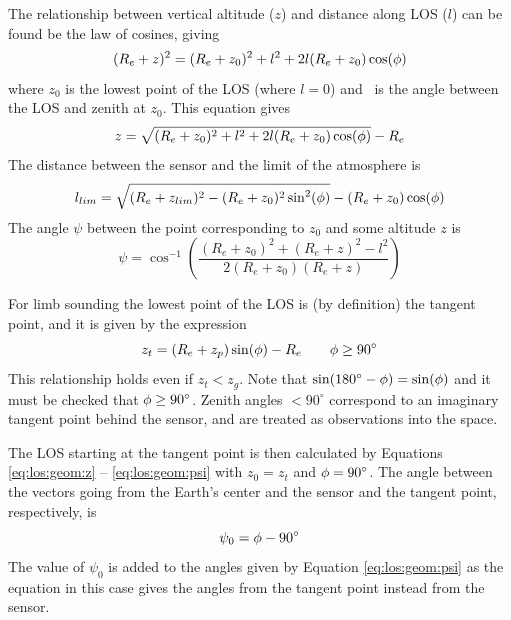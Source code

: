  
  \label{sec:los:general}

  The relationship between vertical altitude ($z$) and distance along
  LOS ($l$) can be found be the law of cosines, giving
  \begin{equation}
    (R_e+z)^2 = (R_e+z_0)^2 + l^2 + 2l(R_e+z_0)\cos(\phi)
  \end{equation}
  where $z_0$ is the lowest point of the LOS (where $l=0$) and \view\
  is the angle between the LOS and zenith at $z_0$. This equation 
  gives
  \begin{equation}
    z = \sqrt{ (R_e+z_0)^2 + l^2 + 2l(R_e+z_0)\cos(\phi) } - R_e
   \label{eq:los:geom:z}
  \end{equation}
  The distance between the sensor and the limit of the atmosphere is
  \begin{equation}
      l_{lim} = \sqrt{ (R_e+z_{lim})^2 - (R_e+z_0)^2\sin^2(\phi) } - 
                                       (R_e+z_0)\cos(\phi)
   \label{eq:los:geom:llim}
  \end{equation}
  The angle $\psi$ between the point corresponding to $z_0$ and
  some altitude $z$ is
  \begin{equation}
      \psi = \cos^{-1}\left( \frac{(R_e+z_0)^2 + (R_e+z)^2 - l^2}
                                                   {2(R_e+z_0)(R_e+z)} \right) 
   \label{eq:los:geom:psi}
  \end{equation} 



  \label{sec:los:limb}
  
  For limb sounding the lowest point of the LOS is (by definition) the
  tangent point, and it is given by the expression
  \begin{equation}
    z_t = (R_e+z_p)\sin(\phi) - R_e \qquad  \phi\geq90^\circ
   \label{eq:los:ztan}
  \end{equation}
  This relationship holds even if $z_t<z_g$. Note that
  $\sin(180^\circ-\phi)=\sin(\phi)$ and it must be checked that
  $\phi\geq90^\circ$. Zenith angles $<90^\circ$ correspond to an
  imaginary tangent point behind the sensor, and are treated as
  observations into the space.

  The LOS starting at the tangent point is then calculated by 
  Equations \ref{eq:los:geom:z} -- \ref{eq:los:geom:psi} with $z_0 = z_t$
  and $\phi = 90^\circ$. The angle between the vectors going from the
  Earth's center and the sensor and the tangent point, respectively,
  is
  \begin{equation}
    \psi_0 = \phi - 90^\circ
  \end{equation}
  The value of $\psi_0$ is added to the angles given by Equation 
  \ref{eq:los:geom:psi} as the equation in this case gives the angles 
  from the tangent point instead from the sensor.

